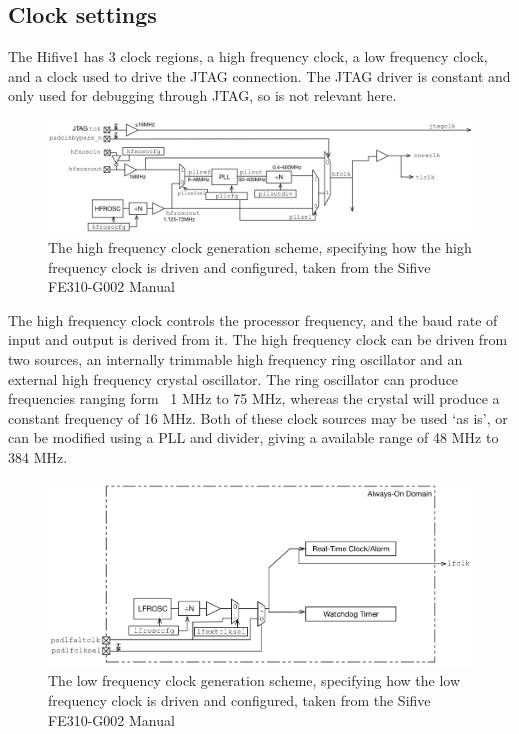 \subsection{Clock settings}
The Hifive1 has 3 clock regions, a high frequency clock, a low frequency clock, and a clock used to drive the JTAG connection. The JTAG driver is constant and only used for debugging through JTAG, so is not relevant here.
\\

\begin{figure}[H]
    \includegraphics[width=0.9\columnwidth]{figures/hfclock.png}
    \centering
    \caption[High Frequency Clock Diagram]{The high frequency clock generation scheme, specifying how the high frequency clock is driven and configured, taken from the Sifive FE310-G002 Manual\cite{sifive_manual}}
\end{figure}
The high frequency clock controls the processor frequency, and the baud rate of input and output is derived from it. The high frequency clock can be driven from two sources, an internally trimmable high frequency ring oscillator and an external high frequency crystal oscillator. The ring oscillator can produce frequencies ranging form ~1 MHz to 75 MHz, whereas the crystal will produce a constant frequency of 16 MHz. Both of these clock sources may be used `as is', or can be modified using a PLL and divider, giving a available range of 48 MHz to 384 MHz. 
\\
\begin{figure}[H]
    \includegraphics[width=0.9\columnwidth]{figures/lfclock.png}
    \centering
    \caption[Low Frequency Clock Diagram]{The low frequency clock generation scheme, specifying how the low frequency clock is driven and configured, taken from the Sifive FE310-G002 Manual\cite{sifive_manual}}
\end{figure}
